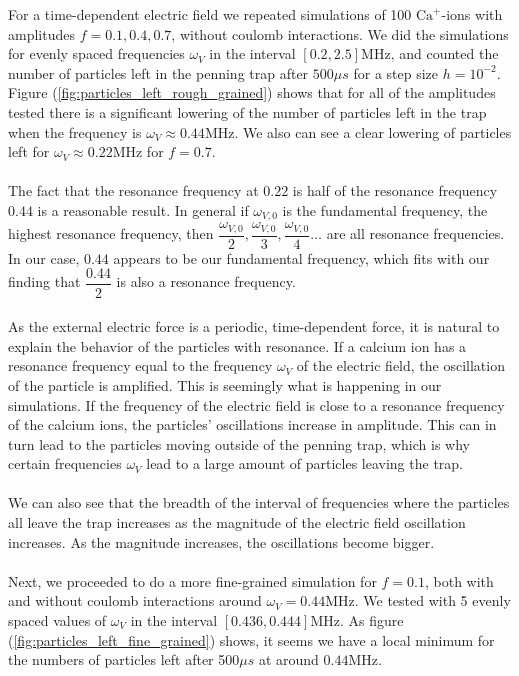 For a time-dependent electric field we repeated simulations of 100 $\text{Ca}^{+}$-ions with amplitudes $f = 0.1, 0.4, 0.7$, without coulomb interactions. We did the simulations for evenly spaced frequencies $\omega_V$ in the interval $[0.2, 2.5]\text{MHz}$, and counted the number of particles left in the penning trap after $500\mu s$ for a step size $h=10^{-2}$. Figure (\ref{fig:particles_left_rough_grained}) shows that for all of the amplitudes tested there is a significant lowering of the number of particles left in the trap when the frequency is $\omega_V \approx 0.44 \text{MHz}$. We also can see a clear lowering of particles left for $\omega_V \approx 0.22 \text{MHz}$ for $f=0.7$. 
\\\\
The fact that the resonance frequency at $0.22$ is half of the resonance frequency $0.44$ is a reasonable result. In general if $\omega_{V,0}$ is the fundamental frequency, the highest resonance frequency, then $\dfrac{\omega_{V,0}}{2}, \dfrac{\omega_{V,0}}{3}, \dfrac{\omega_{V,0}}{4} \ldots$ are all resonance frequencies\cite{harmonic}. In our case, $0.44$ appears to be our fundamental frequency, which fits with our finding that $\dfrac{0.44}{2}$ is also a resonance frequency.
\\\\
As the external electric force is a periodic, time-dependent force, it is natural to explain the behavior of the particles with resonance. If a calcium ion has a resonance frequency equal to the frequency $\omega_V$ of the electric field, the oscillation of the particle is amplified. This is seemingly what is happening in our simulations. If the frequency of the electric field is close to a resonance frequency of the calcium ions, the particles' oscillations increase in amplitude. This can in turn lead to the particles moving outside of the penning trap, which is why certain frequencies $\omega_V$ lead to a large amount of particles leaving the trap.
\\\\
We can also see that the breadth of the interval of frequencies where the particles all leave the trap increases as the magnitude of the electric field oscillation increases. As the magnitude increases, the oscillations become bigger.
\\\\
Next, we proceeded to do a more fine-grained simulation for $f=0.1$, both with and without coulomb interactions around $\omega_V = 0.44 \text{MHz}$. We tested with 5 evenly spaced values of $\omega_V$ in the interval $[0.436, 0.444]\text{MHz}$. As figure (\ref{fig:particles_left_fine_grained}) shows, it seems we have a local minimum for the numbers of particles left after 500$\mu s$ at around $0.44\text{MHz}$. 
